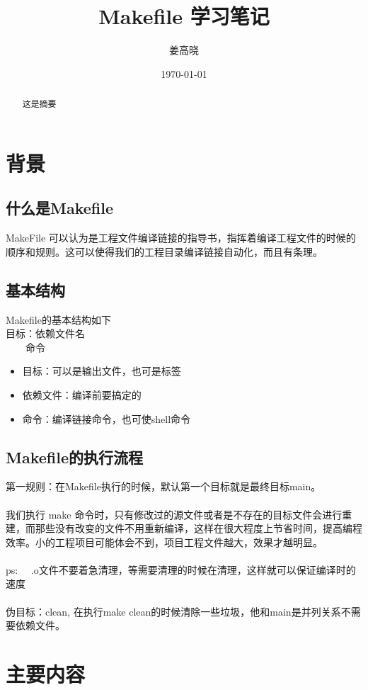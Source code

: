\documentclass{article}
\begin{document}
\begin{CJK}{UTF8}{gkai}
\title{Makefile 学习笔记 }
\author{姜高晓}
\date{\today}
\maketitle
\begin{abstract}
	这是摘要
\end{abstract}

\section{背景}
\subsection{什么是Makefile}
 	MakeFile 可以认为是工程文件编译链接的指导书，指挥着编译工程文件的时候的顺序和规则。这可以使得我们的工程目录编译链接自动化，而且有条理。
\subsection{基本结构}
Makefile的基本结构如下
\\
目标：依赖文件名
\\
\ \ \ \ 命令
\begin{itemize}
	\item 目标：可以是输出文件，也可是标签
	\item 依赖文件：编译前要搞定的
	\item 命令：编译链接命令，也可使shell命令
\end{itemize}

\subsection{Makefile的执行流程}
第一规则：在Makefile执行的时候，默认第一个目标就是最终目标main。
\\
\\
我们执行 make 命令时，只有修改过的源文件或者是不存在的目标文件会进行重建，而那些没有改变的文件不用重新编译，这样在很大程度上节省时间，提高编程效率。小的工程项目可能体会不到，项目工程文件越大，效果才越明显。
\\
\\
ps: \ \  .o文件不要着急清理，等需要清理的时候在清理，这样就可以保证编译时的速度
\\
\\
伪目标：clean, 在执行make clean的时候清除一些垃圾，他和main是并列关系不需要依赖文件。
\section{主要内容}

\end{CJK}
\end{document}
